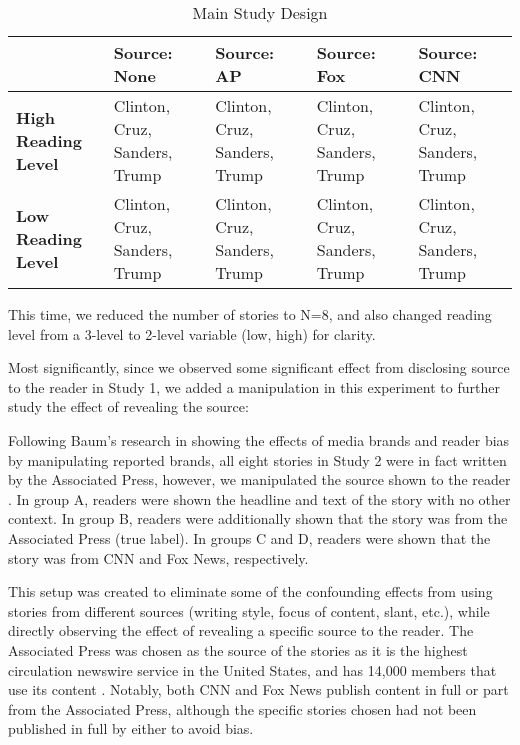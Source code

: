 \begin{center}
\begin{table}
\begin{tabular}{ | m{10em} | m{7em}| m{7em} | m{7em} | m{7em} | } 
 \hline
  & \textbf{Source: None} & \textbf{Source: AP} & \textbf{Source: Fox} & \textbf{Source: CNN} \\
 \hline
 \textbf{High Reading Level} & Clinton, Cruz, Sanders, Trump & Clinton, Cruz, Sanders, Trump & Clinton, Cruz, Sanders, Trump & Clinton, Cruz, Sanders, Trump  \\ 
 \textbf{Low Reading Level} & Clinton, Cruz, Sanders, Trump & Clinton, Cruz, Sanders, Trump & Clinton, Cruz, Sanders, Trump & Clinton, Cruz, Sanders, Trump \\ 
 \hline
\end{tabular}
\caption{Main Study Design}
\label{study2}
\end{table}
\end{center}


This time, we reduced the number of stories to N=8, and also changed reading level from a 3-level to 2-level variable (low, high) for clarity.

Most significantly, since we observed some significant effect from disclosing source to the reader in Study 1, we added a manipulation in this experiment to further study the effect of revealing the source:

Following Baum's research in showing the effects of media brands and reader bias by manipulating reported brands, all eight stories in Study 2 were in fact written by the Associated Press, however, we manipulated the source shown to the reader \cite{baum2008eye}. In group A, readers were shown the headline and text of the story with no other context. In group B, readers were additionally shown that the story was from the Associated Press (true label). In groups C and D, readers were shown that the story was from CNN and Fox News, respectively.

This setup was created to eliminate some of the confounding effects from using stories from different sources (writing style, focus of content, slant, etc.), while directly observing the effect of revealing a specific source to the reader. The Associated Press was chosen as the source of the stories as it is the highest circulation newswire service in the United States, and has 14,000 members that use its content \cite{apFAQ}. Notably, both CNN and Fox News publish content in full or part from the Associated Press, although the specific stories chosen had not been published in full by either to avoid bias.

